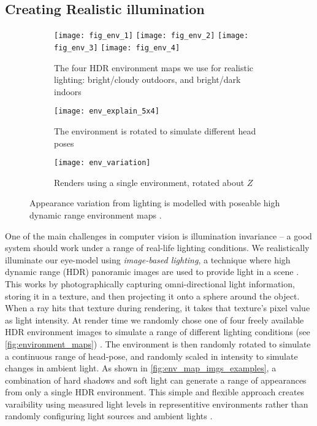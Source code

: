 \subsection{Creating Realistic illumination}

\begin{figure}
    \begin{subfigure}[t]{\columnwidth}
        \texttt{[image: fig\_env\_1]} \hfill
    	\texttt{[image: fig\_env\_2]} \hfill
        \texttt{[image: fig\_env\_3]} \hfill
    	\texttt{[image: fig\_env\_4]}
	    \caption{The four HDR environment maps we use for realistic lighting: bright/cloudy outdoors, and bright/dark indoors}
    \end{subfigure}
    \par \medskip
    \begin{subfigure}[t]{0.48\columnwidth}
        \texttt{[image: env\_explain\_5x4]}
    	\caption{The environment is rotated to simulate different head poses}
    \end{subfigure}%
    \hfill
    \begin{subfigure}[t]{0.48\columnwidth}
        \texttt{[image: env\_variation]}
        \caption{Renders using a single environment, rotated about $Z$}
        \label{fig:env_map_imgs_examples}
    \end{subfigure}
    \caption{Appearance variation from lighting is modelled with poseable high dynamic range environment maps \cite{debevec2002image}.}
    \label{fig:environment_maps}
\end{figure}

One of the main challenges in computer vision is illumination invariance -- a good system should work under a range of real-life lighting conditions.
We realistically illuminate our eye-model using \emph{image-based lighting}, a technique where high dynamic range (HDR) panoramic images are used to provide light in a scene \cite{debevec2002image}.
This works by photographically capturing omni-directional light information, storing it in a texture, and then projecting it onto a sphere around the object.
When a ray hits that texture during rendering, it takes that texture's pixel value as light intensity.
At render time we randomly chose one of four freely available HDR environment images to simulate a range of different lighting conditions (see \autoref{fig:environment_maps}) \cite{AdaptiveSamplesHDR}.
The environment is then randomly rotated to simulate a continuous range of head-pose, and randomly scaled in intensity to simulate changes in ambient light.
As shown in \autoref{fig:env_map_imgs_examples}, a combination of hard shadows and soft light can generate a range of appearances from only a single HDR environment.
This simple and flexible approach creates varaibility using measured light levels in representitive environments rather than randomly configuring light sources and ambient lights \cite{zface}.


